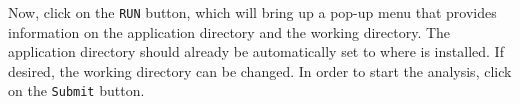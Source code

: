 
Now, click on the \texttt{RUN} button, which will bring up a pop-up
menu that provides information on the application directory and
the working directory. The application directory should already be
automatically set to where \texttt{\getsoftwarename{}} is installed.
If desired, the working directory can be changed. In order to start
the analysis, click on the \texttt{Submit} button.

